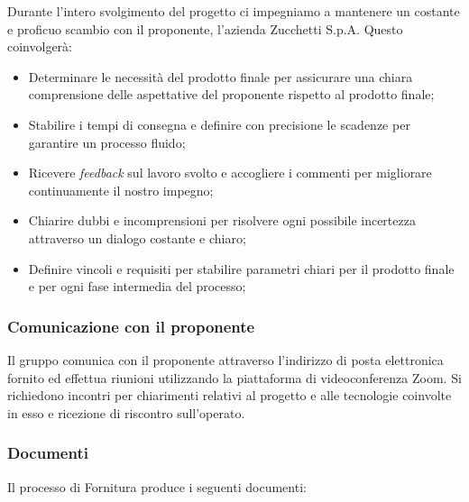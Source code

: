 \documentclass[5pt]{article}
\begin{document}
Durante l'intero svolgimento del progetto ci impegniamo a mantenere un costante e proficuo scambio con il proponente, l'azienda Zucchetti S.p.A. Questo coinvolgerà:
\begin{itemize}
    \item Determinare le necessità del prodotto finale per assicurare una chiara comprensione delle aspettative del proponente rispetto al prodotto finale;
    \item Stabilire i tempi di consegna e definire con precisione le scadenze per garantire un processo fluido;
    \item Ricevere \textit{feedback} sul lavoro svolto e accogliere i commenti per migliorare continuamente il nostro impegno;
    \item Chiarire dubbi e incomprensioni per risolvere ogni possibile incertezza attraverso un dialogo costante e chiaro;
    \item Definire vincoli e requisiti per stabilire parametri chiari per il prodotto finale e per ogni fase intermedia del processo;
\end{itemize}

\subsubsection{Comunicazione con il proponente}
Il gruppo comunica con il proponente attraverso l'indirizzo di posta elettronica fornito ed effettua riunioni utilizzando la piattaforma di videoconferenza Zoom.
Si richiedono incontri per chiarimenti relativi al progetto e alle tecnologie coinvolte in esso e ricezione di riscontro sull'operato.

\subsubsection{Documenti}
Il processo di Fornitura produce i seguenti documenti:
\end{document}
